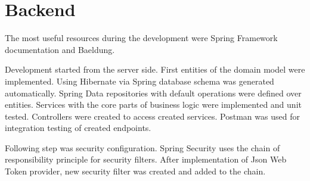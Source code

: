 
\section{Backend}\label{sec:backend}

The most useful resources during the development were Spring Framework documentation and Baeldung.\cite{spring-doc, baeldung}

Development started from the server side.
First entities of the domain model were implemented.
Using Hibernate via Spring database schema was generated automatically.
Spring Data repositories with default operations were defined over entities.
Services with the core parts of business logic were implemented and unit tested.
Controllers were created to access created services.
Postman was used for integration testing of created endpoints.

Following step was security configuration.
Spring Security uses the chain of responsibility principle for security filters.
After implementation of Json Web Token provider, new security filter was created and added to the chain.